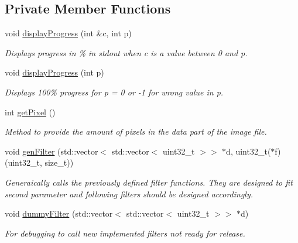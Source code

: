 \subsection*{Private Member Functions}
\begin{DoxyCompactItemize}
\item 
void \mbox{\hyperlink{classSteganoMessage_a50936bb2352eaaa1112280c2ac3ca2d5}{display\+Progress}} (int \&c, int p)
\begin{DoxyCompactList}\small\item\em Displays progress in \% in stdout when c is a value between 0 and p. \end{DoxyCompactList}\item 
void \mbox{\hyperlink{classSteganoMessage_aa6e24f6ed5afcf38dcba28fb91a74d21}{display\+Progress}} (int p)
\begin{DoxyCompactList}\small\item\em Displays 100\% progress for p = 0 or -\/1 for wrong value in p. \end{DoxyCompactList}\item 
int \mbox{\hyperlink{classSteganoMessage_a12231d3596b90fe4c6d67bd694b27d07}{get\+Pixel}} ()
\begin{DoxyCompactList}\small\item\em Method to provide the amount of pixels in the data part of the image file. \end{DoxyCompactList}\item 
void \mbox{\hyperlink{classSteganoMessage_a1cb326688e9a054127396d198bd6f976}{gen\+Filter}} (std\+::vector$<$ std\+::vector$<$ uint32\+\_\+t $>$$>$ $\ast$d, uint32\+\_\+t($\ast$f)(uint32\+\_\+t, size\+\_\+t))
\begin{DoxyCompactList}\small\item\em Generaically calls the previously defined filter functions. They are designed to fit second parameter and following filters should be designed accordingly. \end{DoxyCompactList}\item 
void \mbox{\hyperlink{classSteganoMessage_a1a26242c2e6d146cba1ad6831ab60ba7}{dummy\+Filter}} (std\+::vector$<$ std\+::vector$<$ uint32\+\_\+t $>$$>$ $\ast$d)
\begin{DoxyCompactList}\small\item\em For debugging to call new implemented filters not ready for release. \end{DoxyCompactList}\end{DoxyCompactItemize}
